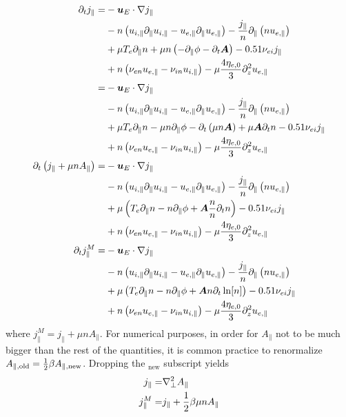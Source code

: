 \begin{align*}
 \partial_t j_\|
=&
- \boldsymbol{u}_E \cdot \nabla j_\|
    \\&
    - n \left( u_{i, \|}  \partial_\| u_{i,\|} - u_{e, \|} \partial_\| u_{e,\|} \right)
    - \frac{j_\|}{n}\partial_\|\left(n u_{e,\|} \right)
    \\&
    + \mu T_e\partial_\| n
    + \mu n\left(-\partial_\| \phi - \partial_t \boldsymbol{A}\right)
    - 0.51 \nu_{ei} j_\|
    \\ &
    + n \left(\nu_{e n}u_{e,\|}-\nu_{i n}u_{i,\|} \right)
    - \mu \frac{4\eta_{e,0}}{3} \partial_z^2 u_{e,\|}
 \\
=&
- \boldsymbol{u}_E \cdot \nabla j_\|
    \\&
    - n \left( u_{i, \|}  \partial_\| u_{i,\|} - u_{e, \|} \partial_\| u_{e,\|} \right)
    - \frac{j_\|}{n}\partial_\|\left(n u_{e,\|} \right)
    \\&
    + \mu T_e\partial_\| n
    - \mu n\partial_\| \phi
    - \partial_t\left(\mu n \boldsymbol{A}\right)
    + \mu\boldsymbol{A}\partial_t n
    - 0.51 \nu_{ei} j_\|
    \\ &
    + n \left(\nu_{e n}u_{e,\|}-\nu_{i n}u_{i,\|} \right)
    - \mu \frac{4\eta_{e,0}}{3} \partial_z^2 u_{e,\|}
 \\
 \partial_t \left(j_\|+ \mu n A_\| \right)
=&
- \boldsymbol{u}_E \cdot \nabla j_\|
    \\&
    - n \left( u_{i, \|}  \partial_\| u_{i,\|} - u_{e, \|} \partial_\| u_{e,\|} \right)
    - \frac{j_\|}{n}\partial_\|\left(n u_{e,\|} \right)
    \\&
    + \mu
    \left( T_e\partial_\| n
    -  n\partial_\| \phi
    + \boldsymbol{A}\frac{n}{n}\partial_t n
    \right)
    - 0.51 \nu_{ei} j_\|
    \\ &
    + n \left(\nu_{e n}u_{e,\|}-\nu_{i n}u_{i,\|} \right)
    - \mu \frac{4\eta_{e,0}}{3} \partial_z^2 u_{e,\|}
 \\
 \partial_t j^M_\|
=&
- \boldsymbol{u}_E \cdot \nabla j_\|
    \\&
    - n \left( u_{i, \|}  \partial_\| u_{i,\|} - u_{e, \|} \partial_\| u_{e,\|} \right)
    - \frac{j_\|}{n}\partial_\|\left(n u_{e,\|} \right)
    \\&
    + \mu
    \left( T_e\partial_\| n
    -  n\partial_\| \phi
    + \boldsymbol{A}n\partial_t \ln[n]
    \right)
    - 0.51 \nu_{ei} j_\|
    \\ &
    + n \left(\nu_{e n}u_{e,\|}-\nu_{i n}u_{i,\|} \right)
    - \mu \frac{4\eta_{e,0}}{3} \partial_z^2 u_{e,\|}
\end{align*}
%
where $j^M_\| = j_\|+ \mu n A_\|$.
%
For numerical purposes, in order for $A_\|$ not to be much bigger than the rest of the quantities, it is common practice to renormalize $A_{\|, \text{old}} = \frac{1}{2}\beta A_{\|, \text{new}}$.
Dropping the $_{\text{new}}$ subscript yields %
%
\begin{align*}
    j_\| =& \nabla^2_\perp A_\|\\
    j^M_\| =& j_\|+ \frac{1}{2}\beta\mu n A_\|
\end{align*}
